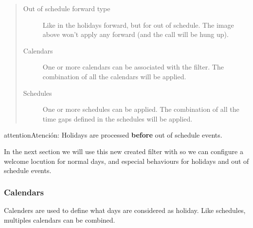 \documentclass[letterpaper,10pt,spanish]{sphinxmanual}
\begin{document}
\begin{quote}
\begin{description}
\item[{Out of schedule forward type}] \leavevmode
Like in the holidays forward, but for out of schedule. The image above
won't apply any forward (and the call will be hung up).

\item[{Calendars}] \leavevmode
One or more calendars can be associated with the filter. The combination
of all the calendars will be applied.

\item[{Schedules}] \leavevmode
One or more schedules can be applied. The combination of all the time
gaps defined in the schedules will be applied.

\end{description}
\end{quote}

\begin{notice}{attention}{Atención:}
Holidays are processed \textbf{before} out of schedule events.
\end{notice}

In the next section we will use this new created filter with
{\hyperref[administration_portal/brand/views/ddis:ddis]{}} so we can configure a welcome locution for normal days,
and especial behaviours for holidays and out of schedule events.


\subsubsection{Calendars}
\label{administration_portal/client/vpbx/routing_tools/calendars:calendars}\label{administration_portal/client/vpbx/routing_tools/calendars::doc}\label{administration_portal/client/vpbx/routing_tools/calendars:id1}
Calenders are used to define what days are considered as holiday. Like
schedules, multiples calendars can be combined.
\end{document}
